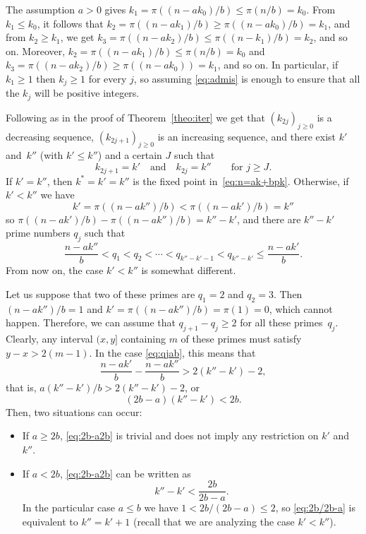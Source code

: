 \documentclass[12pt,reqno]{article}
\begin{document}
The assumption $a>0$ gives $k_1 = \pi((n-ak_0)/b) \le \pi(n/b) = k_0$. From $k_1 \le k_0$, it follows that $k_2 = \pi((n-ak_1)/b) \ge \pi((n-ak_0)/b) = k_1$, and from $k_2 \ge k_1$, we get $k_3 = \pi((n-ak_2)/b) \le \pi((n-k_1)/b) = k_2$, and so on. 
Moreover, $k_2 = \pi((n-ak_1)/b) \le \pi(n/b) = k_0$
and $k_3 = \pi((n-ak_2)/b) \ge \pi((n-ak_0)) = k_1$, and so on.
In particular, if $k_1 \ge 1$ then $k_j \ge 1$ for every $j$, 
so assuming \eqref{eq:admis} is enough to ensure that all the $k_j$ will be positive integers.

Following as in the proof of Theorem~\ref{theo:iter} we get that $(k_{2j})_{j\ge0}$ is a decreasing sequence, $(k_{2j+1})_{j\ge0}$ is an increasing sequence, and there exist $k'$ and~$k''$ (with $k' \le k''$) and a certain $J$ such that
\[
  k_{2j+1} = k' 
  \quad\text{and}\quad
  k_{2j} = k'' 
  \qquad \text{for }j \ge J.
\]
If $k' = k''$, then $k^{*} = k'=k''$ is the fixed point in~\eqref{eq:n=ak+bpk}. 
Otherwise, if $k' < k''$ we have
\[
  k' = \pi((n-ak'')/b) < \pi((n-ak')/b) = k''
\]
so $\pi((n-ak')/b)-\pi((n-ak'')/b)=k''-k'$, and there are $k''-k'$ prime numbers $q_j$ such that
\begin{equation}
\label{eq:qjab}
  \frac{n-ak''}{b} < q_1 < q_2 < \cdots < q_{k''-k'-1} < q_{k''-k'} \le \frac{n-ak'}{b}.
\end{equation}
{}From now on, the case $k' < k''$ is somewhat different.

Let us suppose that two of these primes are $q_1 = 2$ and $q_2 = 3$. Then $(n-ak'')/b = 1$ and $k' = \pi((n-ak'')/b) = \pi(1) = 0$, which cannot happen. Therefore, we can assume that $q_{j+1}-q_j \ge 2$ for all these primes~$q_j$. Clearly, any interval $(x,y]$ containing $m$ of these primes must satisfy $y-x > 2(m-1)$. In the case \eqref{eq:qjab}, this means that
\[
  \frac{n-ak'}{b} - \frac{n-ak''}{b} > 2(k''-k')-2,
\]
that is, $a(k''-k')/b > 2(k''-k')-2$, or
\begin{equation}
\label{eq:2b-a2b}
  (2b-a)(k''-k') < 2b.
\end{equation}
Then, two situations can occur:
\begin{itemize}
\item If $a \ge 2b$, \eqref{eq:2b-a2b} is trivial and does not imply any restriction on $k'$ and~$k''$.
\item If $a < 2b$, \eqref{eq:2b-a2b} can be written as
\begin{equation}
\label{eq:2b/2b-a}
  k''-k' < \frac{2b}{2b-a}.
\end{equation}
In the particular case $a \le b$ we have $1 < 2b/(2b-a) \le 2$, so \eqref{eq:2b/2b-a} is equivalent to 
$k'' = k'+1$ (recall that we are analyzing the case $k'<k''$). 
\end{itemize}
\end{document}
